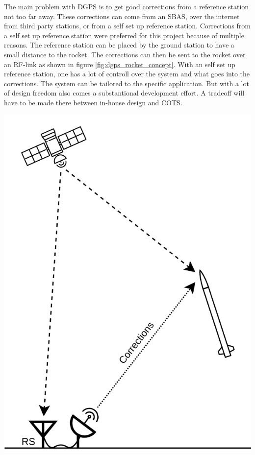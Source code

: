 \begin{minipage}{0.6\textwidth}
  The main problem with DGPS is to get good corrections from a reference station not too far away.
  These corrections can come from an SBAS, over the internet from third party stations, or from a self set up reference station.
  Corrections from a self set up reference station were preferred for this project because of multiple reasons.
  The reference station can be placed by the ground station to have a small distance to the rocket.
  The corrections can then be sent to the rocket over an RF-link as shown in figure \ref{fig:dgps_rocket_concept}.
  With an self set up reference station, one has a lot of controll over the system and what goes into the corrections.
  The system can be tailored to the specific application.
  But with a lot of design freedom also comes a substantional development effort.
  A tradeoff will have to be made there between in-house design and COTS.
\end{minipage}
\hfill
\begin{minipage}{0.35\textwidth}
  \centering
  \includegraphics[width=\textwidth]{images/DGPS_Rocket_Concept.png}
  \label{fig:dgps_rocket_concept}
\end{minipage}

